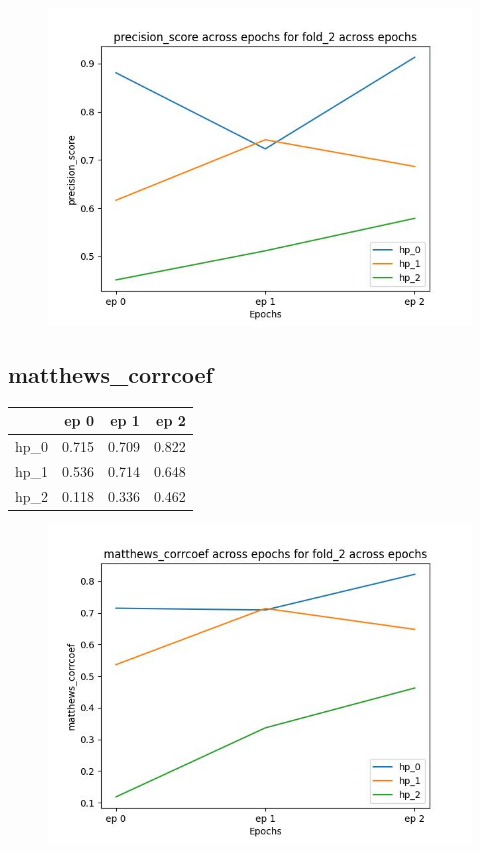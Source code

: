 \documentclass{article}
\begin{document}
\begin{figure}[H]
\includegraphics[scale = 0.75]{fold_2/precision_score}
\end{figure}
\subsection{matthews\_corrcoef}
\begin{tabular}{lrrr}
\toprule
{} &   ep 0 &   ep 1 &   ep 2 \\
\midrule
hp\_0 &  0.715 &  0.709 &  0.822 \\
hp\_1 &  0.536 &  0.714 &  0.648 \\
hp\_2 &  0.118 &  0.336 &  0.462 \\
\bottomrule
\end{tabular}

\begin{figure}[H]
\includegraphics[scale = 0.75]{fold_2/matthews_corrcoef}
\end{figure}
\end{document}
